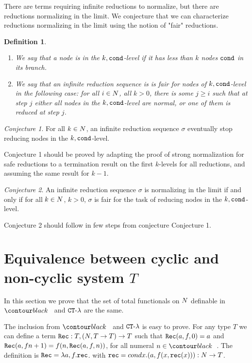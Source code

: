 \documentclass{article}
\newtheorem{definition}[theorem]{Definition}
\begin{document}
There are terms requiring infinite reductions to normalize, but there are reductions normalizing in the limit.
We conjecture that we can characterize reductions normalizing in the limit using the notion of "fair" reductions.

\begin{definition}
\begin{enumerate}
\item
We say that a node is in the $k,{\tt cond}$-level if it has less than $k$ nodes ${\tt cond}$ in its branch.
\item
We say that an infinite reduction sequence is is \emph{fair} for nodes of $k,{\tt cond}$-level in the following case:
for all $i\in {N}$, all $k>0$, there is some  $j \ge i$ such that at step $j$ either all nodes in the 
$k,{\tt cond}$-level are normal, or one of them is reduced at step $j$.
\end{enumerate}
\end{definition}

\emph{Conjecture 1}. For all $k \in {N}$, an infinite reduction sequence $\sigma$ 
eventually stop reducing nodes in the $k,{\tt cond}$-level.

Conjecture 1 should be proved by adapting the proof of strong normalization for safe reductions to a
termination result on the first $k$-levels for all reductions, and assuming the same result for $k-1$.

\emph{Conjecture 2}. An infinite reduction sequence $\sigma$ 
is normalizing in the limit if and only if for all $k \in {N}$,
$k > 0$, $\sigma$ is fair for the task of reducing nodes in the $k,{\tt cond}$-level.

Conjecture 2 should follow in few steps from conjecture Conjecture 1.



\section{Equivalence between cyclic and non-cyclic system $T$} 

In this section we prove that the set of total functionals on ${N}$ definable in 
$\systemT$ and ${ {\tt CT} \mbox{-} \lambda}$ are the same.

The inclusion from $\systemT$ and ${ {\tt CT} \mbox{-} \lambda}$ is easy to prove.
For any type $T$ we can define a term ${\tt Rec}:T,({N},T \rightarrow T)\rightarrow T$ such that
${\tt Rec}(a,f,0) = a$ and ${\tt Rec}(a,fn+1) = f(n,{\tt Rec}(a,f,n))$, for all numeral $n \in \Nat$.
The definition is ${\tt Rec} = \lambda a,f.{\tt rec}$. with ${\tt rec} = cond x.(a,f(x,{\tt rec}(x))) : {N} \rightarrow T$.
\end{document}
